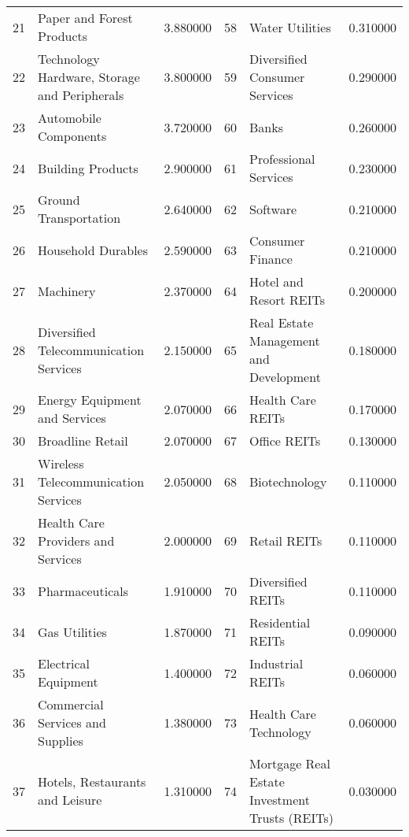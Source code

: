 \begin{tabular}{rlrrlr}
21 & Paper and Forest Products & 3.880000 & 58 & Water Utilities & 0.310000 \\
22 & Technology Hardware, Storage and Peripherals & 3.800000 & 59 & Diversified Consumer Services & 0.290000 \\
23 & Automobile Components & 3.720000 & 60 & Banks & 0.260000 \\
24 & Building Products & 2.900000 & 61 & Professional Services & 0.230000 \\
25 & Ground Transportation & 2.640000 & 62 & Software & 0.210000 \\
26 & Household Durables & 2.590000 & 63 & Consumer Finance & 0.210000 \\
27 & Machinery & 2.370000 & 64 & Hotel and Resort REITs & 0.200000 \\
28 & Diversified Telecommunication Services & 2.150000 & 65 & Real Estate Management and Development & 0.180000 \\
29 & Energy Equipment and Services & 2.070000 & 66 & Health Care REITs & 0.170000 \\
30 & Broadline Retail & 2.070000 & 67 & Office REITs & 0.130000 \\
31 & Wireless Telecommunication Services & 2.050000 & 68 & Biotechnology & 0.110000 \\
32 & Health Care Providers and Services & 2.000000 & 69 & Retail REITs & 0.110000 \\
33 & Pharmaceuticals & 1.910000 & 70 & Diversified REITs & 0.110000 \\
34 & Gas Utilities & 1.870000 & 71 & Residential REITs & 0.090000 \\
35 & Electrical Equipment & 1.400000 & 72 & Industrial REITs & 0.060000 \\
36 & Commercial Services and Supplies & 1.380000 & 73 & Health Care Technology & 0.060000 \\
37 & Hotels, Restaurants and Leisure & 1.310000 & 74 & Mortgage Real Estate Investment Trusts (REITs) & 0.030000 \\
\bottomrule
\end{tabular}
